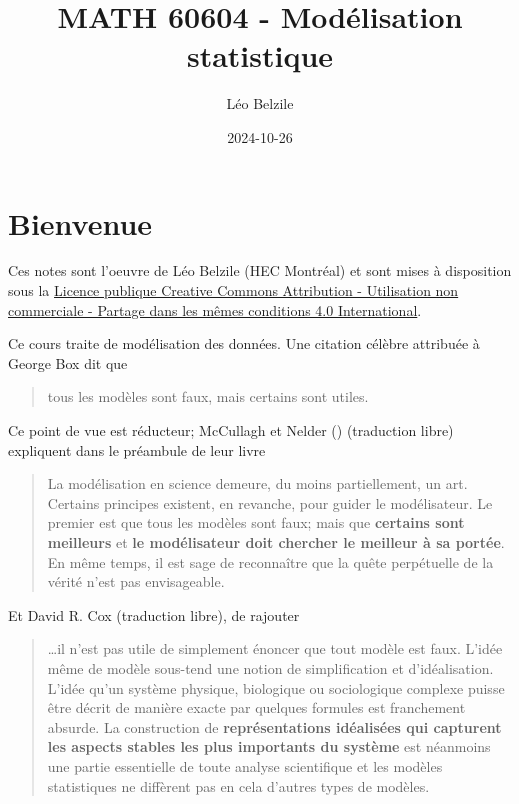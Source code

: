 \documentclass[
  11pt,
  letterpaper,
]{scrbook}
\title{MATH 60604 - Modélisation statistique}
\author{Léo Belzile}
\date{2024-10-26}
\renewcommand*\contentsname{Table des matières}
\newcommand\contentsname{Table des matières}
\theoremstyle{plain}
\theoremstyle{plain}
\theoremstyle{definition}
\theoremstyle{definition}
\theoremstyle{remark}
\begin{document}


\renewcommand*\contentsname{Table des matières}
{
\setcounter{tocdepth}{2}
\tableofcontents
}

\mainmatter
{}

\chapter*{Bienvenue}\label{bienvenue}


Ces notes sont l'oeuvre de Léo Belzile (HEC Montréal) et sont mises à
disposition sous la
\href{https://creativecommons.org/licenses/by-nc-sa/4.0/legalcode.fr}{Licence
publique Creative Commons Attribution - Utilisation non commerciale -
Partage dans les mêmes conditions 4.0 International}.

Ce cours traite de modélisation des données. Une citation célèbre
attribuée à George Box dit que

\begin{quote}
tous les modèles sont faux, mais certains sont utiles.
\end{quote}

Ce point de vue est réducteur; McCullagh et Nelder
() (traduction libre)
expliquent dans le préambule de leur livre

\begin{quote}
La modélisation en science demeure, du moins partiellement, un art.
Certains principes existent, en revanche, pour guider le modélisateur.
Le premier est que tous les modèles sont faux; mais que \textbf{certains
sont meilleurs} et \textbf{le modélisateur doit chercher le meilleur à
sa portée}. En même temps, il est sage de reconnaître que la quête
perpétuelle de la vérité n'est pas envisageable.
\end{quote}

Et David R. Cox (traduction libre), de rajouter

\begin{quote}
\ldots il n'est pas utile de simplement énoncer que tout modèle est
faux. L'idée même de modèle sous-tend une notion de simplification et
d'idéalisation. L'idée qu'un système physique, biologique ou
sociologique complexe puisse être décrit de manière exacte par quelques
formules est franchement absurde. La construction de
\textbf{représentations idéalisées qui capturent les aspects stables les
plus importants du système} est néanmoins une partie essentielle de
toute analyse scientifique et les modèles statistiques ne diffèrent pas
en cela d'autres types de modèles.
\end{quote}
\end{document}
